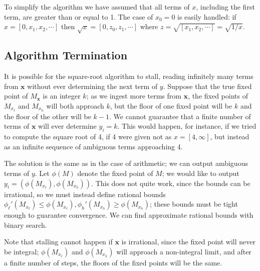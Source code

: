 \documentclass[11pt, oneside]{amsart}   	%
\renewcommand{\:}{\negthickspace:\negthickspace}
\begin{document}
To simplify the algorithm we have assumed that all terms of $x$, including the first term, are greater than or equal to 1. The case of $x_0=0$ is easily handled: if $x = [0,x_1,x_2,\cdots]$ then $\sqrt{x} = [0,z_0,z_1,\cdots]$ where $z = \sqrt{[x_1,x_2,\cdots]} = \sqrt{1/x}$.


\subsection{Algorithm Termination}
It is possible for the square-root algorithm to stall, reading infinitely many terms from $\mathbf{x}$ without ever determining the next term of $y$.
Suppose that the true fixed point of $M_\mathbf{x}$ is an integer $k$; as we ingest more terms from $\mathbf{x}$, the fixed points of $M_{x_\ell}$ and $M_{x_h}$ will both approach  $k$, but the floor of one fixed point will be $k$ and the floor of the other will be $k-1$.
We cannot guarantee that a finite number of terms of $\mathbf{x}$ will ever determine $y_i=k$.
This would happen, for instance, if we tried to compute the square root of 4, if 4 were given not as $x=[4,\infty]$, but instead as an infinite sequence of ambiguous terms approaching 4.

The solution is the same as in the case of arithmetic; we can output ambiguous terms of $y$. Let $\phi(M)$ denote the fixed point of $M$; we would like to output $y_i = (\phi(M_{x_\ell}), \phi(M_{x_h}))$. This does not quite work, since the bounds can be irrational, so we must instead define rational bounds ${\phi_\ell}'(M_{x_\ell}) \leq \phi(M_{x_\ell}), {\phi_h}'(M_{x_h}) \geq \phi(M_{x_h})$;  these bounds must be tight enough to guarantee convergence. We can find approximate rational bounds with binary search.

Note that stalling cannot happen if $\mathbf{x}$ is irrational, since the fixed point will never be integral; $\phi(M_{x_\ell})$ and $\phi(M_{x_h})$ will approach a non-integral limit, and after a finite number of steps, the floors of the fixed points will be the same.
\end{document}
